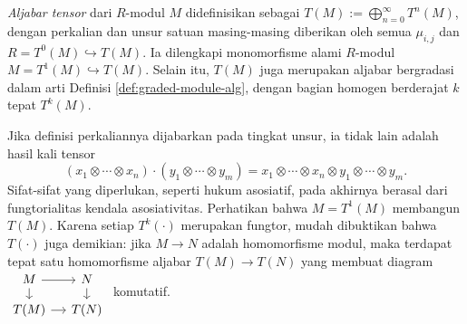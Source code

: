 \begin{definition}
	\emph{Aljabar tensor} dari $R$-modul $M$ didefinisikan sebagai $T(M) := \bigoplus_{n=0}^\infty T^n(M)$, dengan perkalian dan unsur satuan masing-masing diberikan oleh semua $\mu_{i,j}$ dan $R = T^0(M) \hookrightarrow T(M)$. Ia dilengkapi monomorfisme alami $R$-modul $M = T^1(M) \hookrightarrow T(M)$. Selain itu, $T(M)$ juga merupakan aljabar bergradasi dalam arti Definisi \ref{def:graded-module-alg}, dengan bagian homogen berderajat $k$ tepat $T^k(M)$.
\end{definition}
Jika definisi perkaliannya dijabarkan pada tingkat unsur, ia tidak lain adalah hasil kali tensor
\[ (x_1 \otimes \cdots \otimes x_n) \cdot (y_1 \otimes \cdots \otimes y_m) = x_1 \otimes \cdots \otimes x_n \otimes y_1 \otimes \cdots \otimes y_m. \]
Sifat-sifat yang diperlukan, seperti hukum asosiatif, pada akhirnya berasal dari fungtorialitas kendala asosiativitas. Perhatikan bahwa $M = T^1(M)$ membangun $T(M)$. Karena setiap $T^k(\cdot)$ merupakan fungtor, mudah dibuktikan bahwa $T(\cdot)$ juga demikian: jika $M \to N$ adalah homomorfisme modul, maka terdapat tepat satu homomorfisme aljabar $T(M) \to T(N)$ yang membuat diagram
$\begin{tikzcd}[row sep=small, column sep=small]
	M \arrow[r] \arrow[d] & N \arrow[d] \\
	T(M) \arrow[r] & T(N)
\end{tikzcd}$
komutatif.

